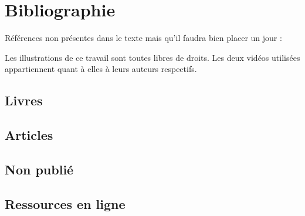 \documentclass[12pt,fleqn,oneside,french,openany]{book} %
\begin{document}


\chapter{Bibliographie}
Références non présentes dans le texte mais qu'il faudra bien placer un jour : \cite{vidcool}  \cite{analysedonnees}

\nocite{imgtitre,imgheader1,imgheader2,imgheader3,imgheader4,imgheader4,imgheader5,logo}

\begin{remark}
	Les illustrations de ce travail sont toutes libres de droits. Les deux vidéos utilisées appartiennent quant à elles à leurs auteurs respectifs.
\end{remark}

\section*{Livres}
\printbibliography[heading=bibempty,type=book]
\section*{Articles}
\printbibliography[heading=bibempty,type=article]
\section*{Non publié}
\printbibliography[heading=bibempty,type=unpublished]
\section*{Ressources en ligne}
\printbibliography[heading=bibempty,type=online]



\end{document}
